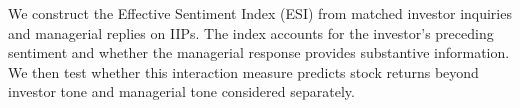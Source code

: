 We construct the Effective Sentiment Index (ESI) from matched investor inquiries and managerial replies on IIPs. The index accounts for the investor's preceding sentiment and whether the managerial response provides substantive information. We then test whether this interaction measure predicts stock returns beyond investor tone and managerial tone considered separately.



